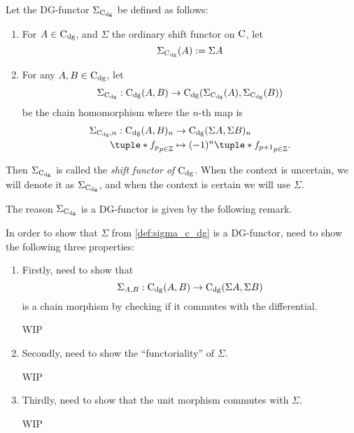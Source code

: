 \begin{definition}[Shift in \( \C_{\dg} \)]
    \label{def:sigma_c_dg}
    Let the DG-functor \( \Sigma_{\operatorname{C}_{\operatorname{dg}}} \) be defined as follows:
    \begin{enumerate}
        \item {
            For \( A \in \operatorname{C}_{\operatorname{dg}} \), and \( \Sigma \) the ordinary shift functor on \( \operatorname{C} \), let
            \[
                \Sigma_{\operatorname{C}_{\operatorname{dg}}}(A) := \Sigma A
            \]
        }
        \item {
            For any \( A, B \in \operatorname{C}_{\operatorname{dg}} \), let
            \begin{align*}
                \Sigma_{\operatorname{C}_{\operatorname{dg}}}: \operatorname{C}_{\operatorname{dg}}(A, B) \to \operatorname{C}_{\operatorname{dg}}(\Sigma_{\operatorname{C}_{\operatorname{dg}}}(A), \Sigma_{\operatorname{C}_{\operatorname{dg}}}(B))
            \end{align*}
            be the chain homomorphism where the \( n \)-th map is
            \begin{align*}
                \Sigma_{\C_{\dg}, n}: \C_{\dg}(A, B)_n &\to \C_{\dg}(\Sigma A, \Sigma B)_n \\
                \tuple*{ f_p }_{p \in \Zb} &\mapsto (-1)^n \tuple*{ f_{p + 1} }_{p \in \Zb}.
            \end{align*}
        }
    \end{enumerate}
    Then \( \Sigma_{\operatorname{C}_{\operatorname{dg}}} \) is called the \emph{shift functor of \( \C_{\dg} \)}. When the context is uncertain, we will denote it as \( \Sigma_{\operatorname{C}_{\operatorname{dg}}} \), and when the context is certain we will use \( \Sigma \).
\end{definition}

The reason \( \Sigma_{\operatorname{C}_{\operatorname{dg}}} \) is a DG-functor is given by the following remark. 

\begin{remark}
    In order to show that \( \Sigma \) from \autoref{def:sigma_c_dg} is a DG-functor, need to show the following three properties:
    \begin{enumerate}
        \item {
            Firstly, need to show that
            \[
                \Sigma_{A, B}: \operatorname{C}_{\operatorname{dg}}(A, B) \to \operatorname{C}_{\operatorname{dg}}(\Sigma A, \Sigma B)
            \]
            is a chain morphism by checking if it commutes with the differential.

            WIP
        }
        \item {
            Secondly, need to show the ``functoriality'' of \( \Sigma \).

            WIP
        }
        \item {
            Thirdly, need to show that the unit morphism commutes with \( \Sigma \).

            WIP
        }
    \end{enumerate}
\end{remark}

